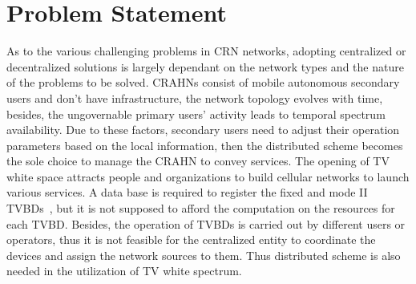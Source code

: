 \section{Problem Statement}
As to the various challenging problems in CRN networks, adopting centralized or decentralized solutions is largely dependant on the network types and the nature of the problems to be solved.
CRAHNs consist of mobile autonomous secondary users and don't have infrastructure, the network topology evolves with time, besides, the ungovernable primary users' activity leads to temporal spectrum availability. 
Due to these factors, secondary users need to adjust their operation parameters based on the local information, then the distributed scheme becomes the sole choice to manage the CRAHN to convey services.
%
The opening of TV white space attracts people and organizations to build cellular networks to launch various services.
A data base is required to register the fixed and mode II TVBDs~\cite{crn_futurecellular_2014}, but it is not supposed to afford the computation on the resources for each TVBD.
Besides, the operation of TVBDs is carried out by different users or operators, thus it is not feasible for the centralized entity to coordinate the devices and assign the network sources to them.
Thus distributed scheme is also needed in the utilization of TV white spectrum.

